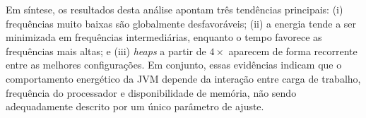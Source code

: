 Em síntese, os resultados desta análise apontam três tendências principais:
(i) frequências muito baixas são globalmente desfavoráveis; (ii) a energia tende
a ser minimizada em frequências intermediárias, enquanto o tempo favorece as
frequências mais altas; e (iii) \textit{heaps} a partir de \(4\times\) aparecem 
de forma recorrente entre as melhores configurações. Em conjunto, essas evidências indicam que o 
comportamento energético da JVM depende da interação entre carga de trabalho, frequência do 
processador e disponibilidade de memória, não sendo adequadamente descrito por um único 
parâmetro de ajuste.